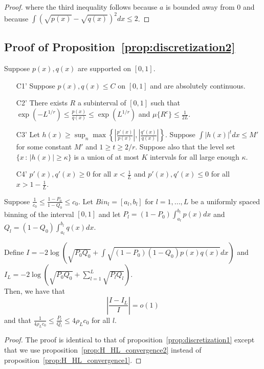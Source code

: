\begin{proof}
where the third inequality follows because $a$ is bounded away from 0 and because $\int (\sqrt{p(x)} - \sqrt{q(x)})^2 dx \leq 2$. 

\end{proof}



\subsection{Proof of Proposition~\ref{prop:discretization2}}

\begin{proposition}
Suppose $p(x), q(x)$ are supported on $[0,1]$.

\begin{enumerate}
\item[C1'] Suppose $p(x), q(x) \leq C$ on $[0,1]$ and are absolutely continuous.
\item[C2'] There exists $R$ a subinterval of $[0,1]$ such that $\exp(-L^{1/r}) \leq \frac{p(x)}{q(x)} \leq \exp(L^{1/r})$ and $\mu\{ R^c \} \leq \frac{1}{2L}$.
\item[C3'] Let $h(x) \geq \sup_n \max \left\{  \left|\frac{p'(x)}{p(x)} \right|, 
 \left|\frac{q'(x)}{q(x)}\right|  \right\} $. Suppose $\int |h(x)|^t dx \leq M'$ for some constant $M'$ and $1 \geq t \geq 2/r$. Suppose also that the level set $\{x \,:\, |h(x)| \geq \kappa\}$ is a union of at most $K$ intervals for all large enough $\kappa$.  
\item[C4']  $p'(x), q'(x) \geq 0$ for all $x < \frac{1}{L}$ and $ p'(x), q'(x) \leq 0$ for all $x > 1-\frac{1}{L}$. 
\end{enumerate}


Suppose $\frac{1}{c_0} \leq \frac{1 - P_0}{1-Q_0} \leq c_0$. Let $Bin_l = [a_l, b_l]$ for $l=1,...,L$ be a uniformly spaced binning of the interval $[0,1]$ and let $P_l = (1- P_0) \int_{a_l}^{b_l} p(x) dx$ and $Q_l = (1-Q_0)\int_{a_l}^{b_l} q(x) dx$. 

Define $I = -2 \log \left( \sqrt{P_0 Q_0} + \int \sqrt{(1-P_0)(1-Q_0) p(x) q(x)} dx \right)$ and $I_L = -2 \log \left( \sqrt{P_0 Q_0} + \sum_{l=1}^L \sqrt{P_l Q_l} \right)$. \\

Then, we have that
 $$\left| \frac{I - I_L}{I} \right| = o(1)$$ 
and that $\frac{1}{4\rho_L c_0} \leq \frac{P_l}{Q_l} \leq 4\rho_L c_0$ for all $l$. 


\end{proposition}

\begin{proof}

The proof is identical to that of proposition~\ref{prop:discretization1} except that we use proposition~\ref{prop:H_HL_convergence2} instead of proposition~\ref{prop:H_HL_convergence1}.

\end{proof}







